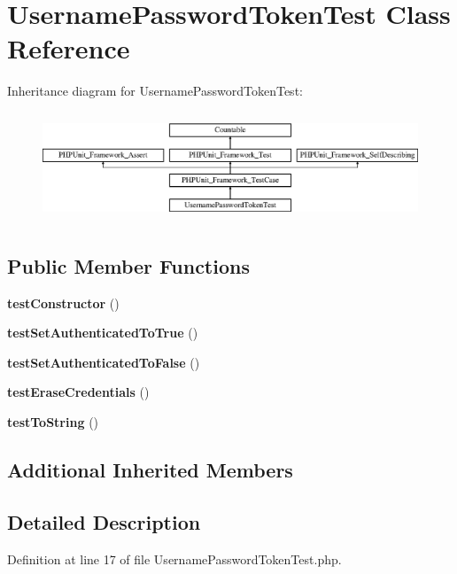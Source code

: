 \section{Username\+Password\+Token\+Test Class Reference}
\label{class_symfony_1_1_component_1_1_security_1_1_core_1_1_tests_1_1_authentication_1_1_token_1_1_username_password_token_test}
Inheritance diagram for Username\+Password\+Token\+Test\+:\begin{figure}[H]
\begin{center}
\leavevmode
\includegraphics[height=3.303835cm]{class_symfony_1_1_component_1_1_security_1_1_core_1_1_tests_1_1_authentication_1_1_token_1_1_username_password_token_test}
\end{center}
\end{figure}
\subsection*{Public Member Functions}
\begin{DoxyCompactItemize}
\item 
{\bf test\+Constructor} ()
\item 
{\bf test\+Set\+Authenticated\+To\+True} ()
\item 
{\bf test\+Set\+Authenticated\+To\+False} ()
\item 
{\bf test\+Erase\+Credentials} ()
\item 
{\bf test\+To\+String} ()
\end{DoxyCompactItemize}
\subsection*{Additional Inherited Members}


\subsection{Detailed Description}


Definition at line 17 of file Username\+Password\+Token\+Test.\+php.



